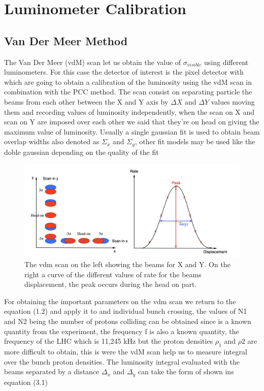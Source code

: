 \chapter{Luminometer Calibration}
\label{ch3}

\section{Van Der Meer Method}

The Van Der Meer (vdM) scan let us obtain the value of $\sigma_{visible}$ using different luminometers. For this case the detector of interest is the pixel detector with which are going to obtain a calibration of the luminosity using the vdM scan in combination with the PCC method. The scan consist on separating particle the beams from each other between the X and Y axis by $\Delta X$ and $\Delta Y$ values moving them and recording values of luminosity independently, when the scan on X and scan on Y are imposed over each other we said that they're on head on giving the maximum value of luminosity. Usually a single gaussian fit is used to obtain beam overlap widths also denoted as $\Sigma_{x}$ and $\Sigma_{y}$, other fit models may be used like the doble gaussian depending on the quality of the fit \cite{Vdm}

\begin{figure}[h]
    \centering
    \includegraphics[width=1\textwidth]{vdm1.png}
    \caption{The vdm scan on the left showing the beams for X and Y. On the right a curve of the different values of rate for the beams displacement, the peak occurs during the head on part.}
    \label{fig:vdm1}
\end{figure}


For obtaining the important parameters on the vdm scan we return to the equation (1.2) and apply it to and individual bunch crossing, the values of N1 and N2 being the number of protons colliding can be obtained since is a known quantity from the experiment, the frequency f is also a known quantity, the frequency of the LHC which is 11,245 kHz but the proton densities $\rho_{1}$ and $\rho{2}$ are more difficult to obtain, this is were the vdM scan help us to measure integral over the bunch proton densities. The luminosity integral evaluated with the beams separated by a distance $\Delta_{x}$ and $\Delta_{y}$ can take the form of shown ins equation (3.1)

